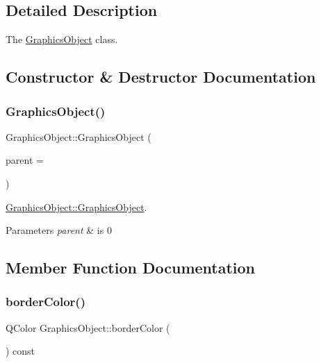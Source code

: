 \subsection{Detailed Description}
The \hyperlink{class_graphics_object}{Graphics\+Object} class. 

\subsection{Constructor \& Destructor Documentation}
\mbox{\label{class_graphics_object_a44e1449dabf506461850b88392c26ce2}} 
\subsubsection{\texorpdfstring{Graphics\+Object()}{GraphicsObject()}}
{\footnotesize\ttfamily Graphics\+Object\+::\+Graphics\+Object (\begin{DoxyParamCaption}\item[{Q\+Object $\ast$}]{parent = {} }\end{DoxyParamCaption})\hspace{0.3cm}{\ttfamily [explicit]}}



\hyperlink{class_graphics_object_a44e1449dabf506461850b88392c26ce2}{Graphics\+Object\+::\+Graphics\+Object}. 


\begin{DoxyParams}{Parameters}
{\em parent} & is 0 \\
\hline
\end{DoxyParams}


\subsection{Member Function Documentation}
\mbox{\label{class_graphics_object_a2d1ae6917ba3a02c305ce48f04e4aa65}} 
\subsubsection{\texorpdfstring{border\+Color()}{borderColor()}}
{\footnotesize\ttfamily Q\+Color Graphics\+Object\+::border\+Color (\begin{DoxyParamCaption}{ }\end{DoxyParamCaption}) const}



